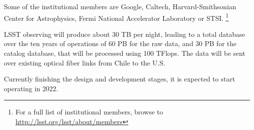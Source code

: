 Some of the institutional members are Google, Caltech, Harvard-Smithsonian Center for Astrophysics, Fermi National Accelerator Laboratory or STSI. \footnote{For a full list of institutional members, browse to \url{http://lsst.org/lsst/about/members}}  \newline


LSST observing will produce about 30 TB per night, leading to a total database over the ten years of operations of 60 PB for the raw data, and 30 PB for the catalog database, that will be processed using 100 TFlops. The data will be sent over existing optical fiber links from Chile to the U.S. \newline

Currently finishing the design and development stages, it is expected to start operating in 2022.